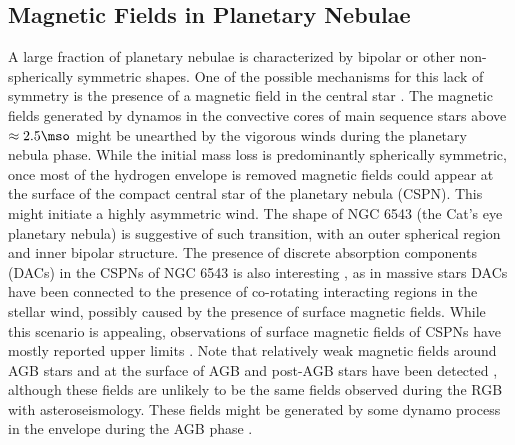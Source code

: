 \subsection{Magnetic Fields in Planetary Nebulae}
A large fraction of planetary nebulae is characterized by bipolar or other non-spherically symmetric shapes. 
One of the possible mechanisms for this lack of symmetry is the presence of a magnetic field in the central star \citep[See e.g.][]{Garc_a_Segura_1997,Chevalier_1994}. The magnetic fields generated by dynamos in the convective cores of main sequence stars above $\approx 2.5\mso$ might be unearthed by the vigorous winds during the planetary nebula phase. While the initial mass loss is predominantly spherically symmetric, once most of the hydrogen envelope is removed magnetic fields could appear at the surface of the compact central star of the planetary nebula (CSPN). This might initiate a highly asymmetric wind. The shape of NGC 6543 (the Cat's eye planetary nebula) is suggestive of such transition, with an outer spherical region and inner bipolar structure. The presence of discrete absorption components (DACs) in the CSPNs of NGC 6543 is also interesting \cite{Prinja_2012}, as in massive stars DACs have been connected to the presence of co-rotating interacting regions in the stellar wind, possibly caused by the presence of surface magnetic fields. While this scenario is appealing, observations of surface magnetic fields of CSPNs have mostly reported upper limits \citep{Jordan_2012,Leone_2014,Asensio_Ramos_2014}.
Note that relatively weak  magnetic fields around AGB stars \cite{Leal_Ferreira_2013} and at the surface of AGB and post-AGB stars have been detected \cite{L_bre_2014,Sabin_2014}, although these fields are unlikely to be the same fields observed during the RGB with asteroseismology. These fields might be generated by some dynamo process in the envelope during the AGB phase \citep[e.g.][]{Nordhaus_2007}.


